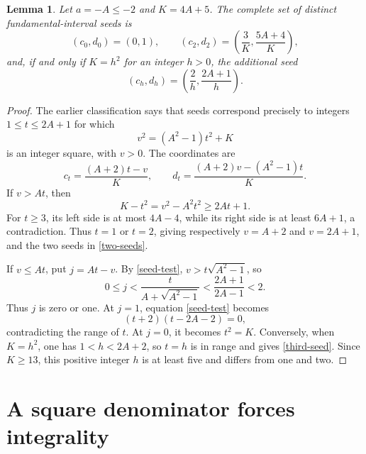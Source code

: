 \documentclass[11pt]{article}
\newtheorem{lemma}[theorem]{Lemma}
\begin{document}
\begin{lemma}\label{negative}
Let \(a=-A\le-2\) and \(K=4A+5\). The complete set of distinct
fundamental-interval seeds is
\begin{equation}\label{two-seeds}
 (c_0,d_0)=(0,1),\qquad
 (c_2,d_2)=\left(\frac3K,\frac{5A+4}K\right),
\end{equation}
and, if and only if \(K=h^2\) for an integer \(h>0\), the
additional seed
\begin{equation}\label{third-seed}
                  (c_h,d_h)=\left(\frac2h,\frac{2A+1}h\right).
\end{equation}
\end{lemma}
\begin{proof}
The earlier classification says that seeds correspond precisely to
integers \(1\le t\le2A+1\) for which
\begin{equation}\label{seed-test}
                         v^2=(A^2-1)t^2+K
\end{equation}
is an integer square, with \(v>0\). The coordinates are
\[
 c_t=\frac{(A+2)t-v}K,\qquad
 d_t=\frac{(A+2)v-(A^2-1)t}K.
\]
If \(v>At\), then
\[
                  K-t^2=v^2-A^2t^2\ge2At+1.
\]
For \(t\ge3\), its left side is at most \(4A-4\), while
its right side is at least \(6A+1\), a contradiction. Thus
\(t=1\) or \(t=2\), giving respectively \(v=A+2\) and
\(v=2A+1\), and the two seeds in \eqref{two-seeds}.

If \(v\le At\), put \(j=At-v\). By \eqref{seed-test},
\(v>t\sqrt{A^2-1}\), so
\[
 0\le j<\frac{t}{A+\sqrt{A^2-1}}
       <\frac{2A+1}{2A-1}<2.
\]
Thus \(j\) is zero or one. At \(j=1\), equation
\eqref{seed-test} becomes
\[
                   (t+2)(t-2A-2)=0,
\]
contradicting the range of \(t\). At \(j=0\), it becomes
\(t^2=K\). Conversely, when \(K=h^2\), one has
\(1<h<2A+2\), so \(t=h\) is in range and gives
\eqref{third-seed}. Since \(K\ge13\), this positive integer
\(h\) is at least five and differs from one and two.
\end{proof}

\section{A square denominator forces integrality}
\end{document}
